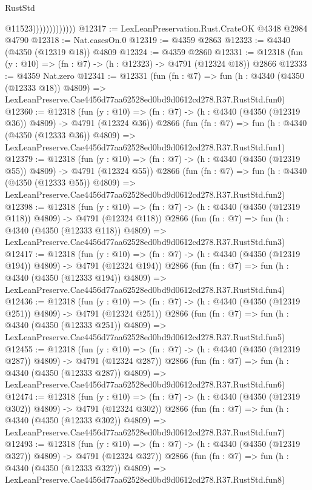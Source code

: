 \begin{lexlean}{RustStd}
\begin{coremodule}
                              @11523)))))))))))))
@12317 := LexLeanPreservation.Rust.CrateOK @4348 @2984 @4790
@12318 := Nat.casesOn.{0}
@12319 := @4359 @2863
@12323 := @4340 (@4350 (@12319 @18)) @4809
@12324 := @4359 @2860
@12331 := @12318 (fun (y : @10) => (fn : @7) -> (h : @12323) -> @4791 (@12324 @18)) @2866
@12333 := @4359 Nat.zero
@12341 := @12331
    (fun (fn : @7) =>
    fun (h : @4340 (@4350 (@12333 @18)) @4809) =>
    LexLeanPreserve.Cae4456d77aa62528ed0bd9d0612cd278.R37.RustStd.fun0)
@12360 := @12318
    (fun (y : @10) => (fn : @7) -> (h : @4340 (@4350 (@12319 @36)) @4809) -> @4791 (@12324 @36))
    @2866
    (fun (fn : @7) =>
    fun (h : @4340 (@4350 (@12333 @36)) @4809) =>
    LexLeanPreserve.Cae4456d77aa62528ed0bd9d0612cd278.R37.RustStd.fun1)
@12379 := @12318
    (fun (y : @10) => (fn : @7) -> (h : @4340 (@4350 (@12319 @55)) @4809) -> @4791 (@12324 @55))
    @2866
    (fun (fn : @7) =>
    fun (h : @4340 (@4350 (@12333 @55)) @4809) =>
    LexLeanPreserve.Cae4456d77aa62528ed0bd9d0612cd278.R37.RustStd.fun2)
@12398 := @12318
    (fun (y : @10) => (fn : @7) -> (h : @4340 (@4350 (@12319 @118)) @4809) -> @4791 (@12324 @118))
    @2866
    (fun (fn : @7) =>
    fun (h : @4340 (@4350 (@12333 @118)) @4809) =>
    LexLeanPreserve.Cae4456d77aa62528ed0bd9d0612cd278.R37.RustStd.fun3)
@12417 := @12318
    (fun (y : @10) => (fn : @7) -> (h : @4340 (@4350 (@12319 @194)) @4809) -> @4791 (@12324 @194))
    @2866
    (fun (fn : @7) =>
    fun (h : @4340 (@4350 (@12333 @194)) @4809) =>
    LexLeanPreserve.Cae4456d77aa62528ed0bd9d0612cd278.R37.RustStd.fun4)
@12436 := @12318
    (fun (y : @10) => (fn : @7) -> (h : @4340 (@4350 (@12319 @251)) @4809) -> @4791 (@12324 @251))
    @2866
    (fun (fn : @7) =>
    fun (h : @4340 (@4350 (@12333 @251)) @4809) =>
    LexLeanPreserve.Cae4456d77aa62528ed0bd9d0612cd278.R37.RustStd.fun5)
@12455 := @12318
    (fun (y : @10) => (fn : @7) -> (h : @4340 (@4350 (@12319 @287)) @4809) -> @4791 (@12324 @287))
    @2866
    (fun (fn : @7) =>
    fun (h : @4340 (@4350 (@12333 @287)) @4809) =>
    LexLeanPreserve.Cae4456d77aa62528ed0bd9d0612cd278.R37.RustStd.fun6)
@12474 := @12318
    (fun (y : @10) => (fn : @7) -> (h : @4340 (@4350 (@12319 @302)) @4809) -> @4791 (@12324 @302))
    @2866
    (fun (fn : @7) =>
    fun (h : @4340 (@4350 (@12333 @302)) @4809) =>
    LexLeanPreserve.Cae4456d77aa62528ed0bd9d0612cd278.R37.RustStd.fun7)
@12493 := @12318
    (fun (y : @10) => (fn : @7) -> (h : @4340 (@4350 (@12319 @327)) @4809) -> @4791 (@12324 @327))
    @2866
    (fun (fn : @7) =>
    fun (h : @4340 (@4350 (@12333 @327)) @4809) =>
    LexLeanPreserve.Cae4456d77aa62528ed0bd9d0612cd278.R37.RustStd.fun8)

\end{coremodule}
\end{lexlean}
